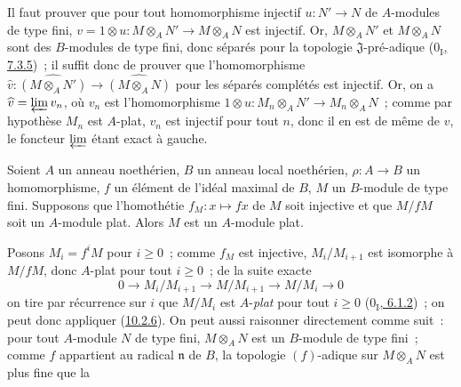 Il faut prouver que pour tout homomorphisme injectif $u:N'\to N$ de
$A$-modules de type fini, $v=1\otimes u:M\otimes_A N'\to M\otimes_A N$ est
injectif. Or, $M\otimes_A N'$ et $M\otimes_A N$ sont des $B$-modules de type
fini, donc séparés pour la topologie $\mathfrak{J}$-pré-adique
(\hyperref[0.7.3.5-fr]{$0_{\mathrm I}$, 7.3.5})~; il suffit donc de prouver que
l'homomorphisme
$\widehat v:\widehat{(M\otimes_A N')}\to\widehat{(M\otimes_A N)}$ pour les
séparés complétés est injectif. Or, on a $\widehat v=\varprojlim v_n$, où
$v_n$ est l'homomorphisme $1\otimes u:M_n\otimes_A N'\to M_n\otimes_A N$~;
comme par hypothèse $M_n$ est $A$-plat, $v_n$ est injectif pour tout $n$, donc
il en est de même de $v$, le foncteur $\varprojlim$ étant exact à gauche.

\begin{corollary}[10.2.7]
\label{0.10.2.7-fr}
Soient $A$ un anneau noethérien, $B$ un anneau local noethérien,
$\rho:A\to B$ un homomorphisme, $f$ un élément de l'idéal maximal de $B$, $M$
un $B$-module de type fini. Supposons que l'homothétie
$f_M:x\mapsto fx$ de $M$ soit injective et que $M/fM$ soit un $A$-module
plat. Alors $M$ est un $A$-module plat.
\end{corollary}

Posons $M_i=f^iM$ pour $i\geq0$~; comme $f_M$ est injective,
$M_i/M_{i+1}$ est isomorphe à $M/fM$, donc $A$-plat pour tout $i\geq0$~; de
la suite exacte
\[
  0\longrightarrow M_i/M_{i+1}\longrightarrow M/M_{i+1}
  \longrightarrow M/M_i\longrightarrow0
\]
on tire par récurrence sur $i$ que $M/M_i$ est $A$-\emph{plat} pour tout
$i\geq0$ (\hyperref[0.6.1.2-fr]{$0_{\mathrm I}$, 6.1.2})~; on peut donc
appliquer (\hyperref[0.10.2.6-fr]{10.2.6}). On peut aussi raisonner directement
comme suit~: pour tout $A$-module $N$ de type fini, $M\otimes_A N$ est un
$B$-module de type fini~; comme $f$ appartient au radical $\mathfrak n$ de
$B$, la topologie $(f)$-adique sur $M\otimes_A N$ est plus fine que la

